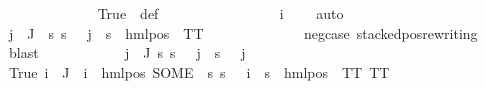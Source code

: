 \begin{isabellebody}
\ \ \ \ \ \ \ \ \ \ \ \ \isamarkupfalse%
\ True\ {\isachardoublequoteopen}{}{\isachardoublequoteclose}\ {\isasymPsi}{\isacharunderscore}{\kern0pt}def\ \ \isanewline
\ \ \ \ \ \ \ \ \ \ \ \ \isamarkupfalse%
\ {\isacartoucheopen}{\isasymPhi}\ i{\isacharunderscore}{\kern0pt}{\isasymphi}\ {\isacharequal}{\kern0pt}\ {\isasymphi}{\isacartoucheclose}\ \isamarkupfalse%
\ auto\isanewline
\ \ \ \ \ \ \ \ \ \ \isamarkupfalse%
\ {\isachardoublequoteopen}{\isasymforall}j\ {\isasymin}\ J{\isachardot}{\kern0pt}\ {\isasymexists}{\isasymalpha}{\isachardot}{\kern0pt}\ {\isacharparenleft}{\kern0pt}{\isasymforall}s{\isachardot}{\kern0pt}\ {\isacharparenleft}{\kern0pt}s\ {\isasymTurnstile}\ {\isasymPhi}\ j{\isacharparenright}{\kern0pt}\ {\isasymlongleftrightarrow}\ {\isacharparenleft}{\kern0pt}s\ {\isasymTurnstile}\ {\isacharparenleft}{\kern0pt}hml{\isacharunderscore}{\kern0pt}pos\ {\isasymalpha}\ TT{\isacharparenright}{\kern0pt}{\isacharparenright}{\kern0pt}{\isacharparenright}{\kern0pt}{\isachardoublequoteclose}\isanewline
\ \ \ \ \ \ \ \ \ \ \ \ \isamarkupfalse%
\ neg{\isacharunderscore}{\kern0pt}case\ stacked{\isacharunderscore}{\kern0pt}pos{\isacharunderscore}{\kern0pt}rewriting\ {\isachardoublequoteopen}{}{\isachardoublequoteclose}\ \isamarkupfalse%
\ blast\isanewline
\ \ \ \ \ \ \ \ \ \ \isamarkupfalse%
\ {\isachardoublequoteopen}{\isasymforall}j\ {\isasymin}\ J{\isachardot}{\kern0pt}\ {\isacharparenleft}{\kern0pt}{\isasymforall}s{\isachardot}{\kern0pt}\ {\isacharparenleft}{\kern0pt}s\ {\isasymTurnstile}\ {\isasymPhi}\ j{\isacharparenright}{\kern0pt}\ {\isasymlongleftrightarrow}\ {\isacharparenleft}{\kern0pt}s\ {\isasymTurnstile}\ {\isasymPsi}\ j{\isacharparenright}{\kern0pt}{\isacharparenright}{\kern0pt}{\isachardoublequoteclose}\isanewline
\ \ \ \ \ \ \ \ \ \ \ \ \isamarkupfalse%
\ True\ {\isacartoucheopen}{\isasymforall}i\ {\isasymin}\ J{\isachardot}{\kern0pt}\ {\isasymPsi}\ i\ {\isacharequal}{\kern0pt}\ {\isacharparenleft}{\kern0pt}hml{\isacharunderscore}{\kern0pt}pos\ {\isacharparenleft}{\kern0pt}SOME\ {\isasymalpha}{\isachardot}{\kern0pt}\ {\isacharparenleft}{\kern0pt}{\isasymforall}s{\isachardot}{\kern0pt}\ {\isacharparenleft}{\kern0pt}s\ {\isasymTurnstile}\ {\isasymPhi}\ i{\isacharparenright}{\kern0pt}\ {\isasymlongleftrightarrow}\ {\isacharparenleft}{\kern0pt}s\ {\isasymTurnstile}\ {\isacharparenleft}{\kern0pt}hml{\isacharunderscore}{\kern0pt}pos\ {\isasymalpha}\ TT{\isacharparenright}{\kern0pt}{\isacharparenright}{\kern0pt}{\isacharparenright}{\kern0pt}{\isacharparenright}{\kern0pt}\ TT{\isacharparenright}{\kern0pt}{\isacartoucheclose}\isanewline

\end{isabellebody}
